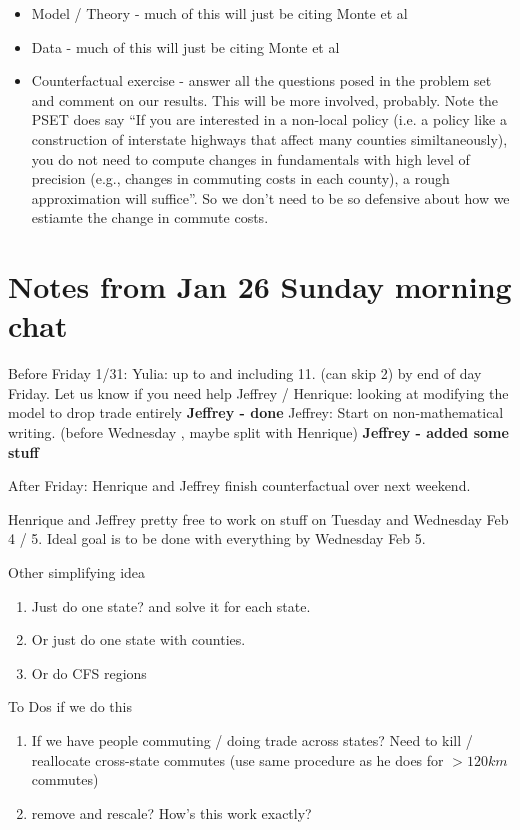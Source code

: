 \documentclass{article}
\begin{document}
\begin{enumerate}
\begin{itemize}
    \item Model / Theory - much of this will just be citing Monte et al
    \item Data   - much of this will just be citing Monte et al
    \item Counterfactual exercise - answer all the questions posed in the problem set and comment on our results. This will be more involved, probably. Note the PSET does say ``If you are interested in a non-local policy (i.e. a policy like a construction of interstate highways that affect many counties similtaneously), you do not need to compute changes in fundamentals with high level of precision (e.g., changes in commuting costs in each county), a rough approximation will suffice''. So we don't need to be so defensive about how we estiamte the change in commute costs.
    \end{itemize}
\end{enumerate}


\section{Notes from Jan 26 Sunday morning chat}
Before Friday 1/31: 
Yulia: up to and including 11. (can skip 2) by end of day Friday. Let us know if you need help
Jeffrey / Henrique: looking at modifying the model to drop trade entirely \textbf{Jeffrey - done} 
Jeffrey: Start on non-mathematical writing. (before Wednesday , maybe split with Henrique) \textbf{Jeffrey - added some stuff}
 
After Friday:
Henrique and Jeffrey finish counterfactual over next weekend. 


Henrique and Jeffrey pretty free to work on stuff on Tuesday and Wednesday Feb 4 / 5.
Ideal goal is to be done with everything by Wednesday Feb 5. 


Other simplifying idea

\begin{enumerate}
\item Just do one state? and solve it for each state. 
\item Or just do one state with counties.
\item Or do CFS regions
\end{enumerate}

To Dos if we do this
\begin{enumerate}
\item If we have people commuting / doing trade across states?  Need to kill / reallocate cross-state commutes (use same procedure as he does for $>120km$ commutes)
\item remove and rescale? How's this work exactly? 

\end{enumerate}
\end{document}
